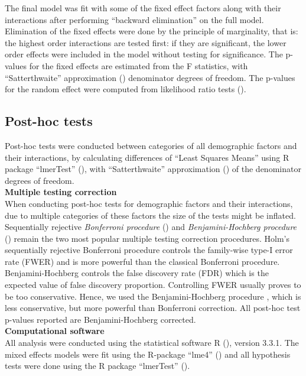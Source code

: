 \documentclass[11pt]{extarticle} %
\begin{document}
The final model was fit with some of the fixed effect factors along with their interactions after performing ``backward elimination'' on the full model. Elimination of the fixed effects were done by the principle of marginality, that is: the highest order interactions are tested first: if they are significant, the lower order effects were included in the model without testing for significance. The p-values for the fixed effects are estimated from the F statistics, with ``Satterthwaite'' approximation (\cite{Satterthwaite_1946_Biometrics}) denominator degrees of freedom. The p-values for the random effect were computed from likelihood ratio tests (\cite{Morrell_1998_Biometrics}). 

\subsection*{Post-hoc tests}
Post-hoc tests were conducted between categories of all demographic factors and their interactions, by calculating differences of ``Least Squares Means'' using R package ``lmerTest'' (\cite{Kuznetsova_etal_2015_R-lmerTest}), with ``Satterthwaite'' approximation (\cite{Satterthwaite_1946_Biometrics}) of the denominator degrees of freedom. \\

\noindent
{\bf{Multiple testing correction}}\\
When conducting post-hoc tests for demographic factors and their interactions, due to multiple categories of these factors the size of the tests might be inflated. Sequentially rejective {\emph{Bonferroni procedure}} (\cite{Holm_1979_SJS}) and {\emph{Benjamini-Hochberg procedure}} (\cite{Benjamini_Hochberg_1995_JRSSB}) remain the two most popular multiple testing correction procedures. Holm's sequentially rejective Bonferroni procedure controls the family-wise type-I error rate (FWER) and is more powerful than the classical Bonferroni procedure. Benjamini-Hochberg controls the false discovery rate (FDR) which is the expected value of false discovery proportion. Controlling FWER usually proves to be too conservative. Hence, we used the Benjamini-Hochberg procedure , which is less conservative, but more powerful than Bonferroni correction. All post-hoc test p-values reported are Benjamini-Hochberg corrected. \\

\noindent
{\bf{Computational software}}\\
All analysis were conducted using the statistical software R (\cite{R}), version 3.3.1. The mixed effects models were fit using the R-package ``lme4'' (\cite{R-lme4}) and all hypothesis tests were done using the R package ``lmerTest'' (\cite{Kuznetsova_etal_2015_R-lmerTest}). 
\end{document}
